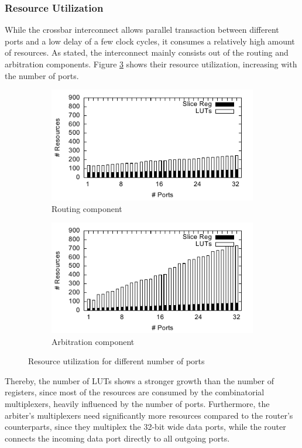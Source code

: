 \subsubsection{Resource Utilization}
While the crossbar interconnect allows parallel transaction between different
ports and a low delay of a few clock cycles, it consumes a relatively high
amount of resources. As stated, the interconnect mainly consists out of the
routing and arbitration components. Figure \ref{fig:crossbar_util} shows their
resource utilization, increasing with the number of ports.
\begin{figure}
	\centering
	\begin{subfigure}{0.49\textwidth}
		\centering
		\includegraphics{../figures/eval_router}
		\caption{Routing component}
		\label{fig:crossbar_util_router}
	\end{subfigure}
	\begin{subfigure}{0.49\textwidth}
		\centering
		\includegraphics{../figures/eval_arbiter}
		\caption{Arbitration component}
		\label{fig:crossbar_util_arbiter}
	\end{subfigure}
	\caption{Resource utilization for different number of ports}
	\label{fig:crossbar_util}
\end{figure}
Thereby, the number of \acp{LUT} shows a stronger growth than the number of
registers, since most of the resources are consumed by the combinatorial
multiplexers, heavily influenced by the number of ports. Furthermore, the
arbiter's multiplexers need significantly more resources compared to the
router's counterparts, since they multiplex the 32-bit wide data ports, while
the router connects the incoming data port directly to all outgoing ports.

